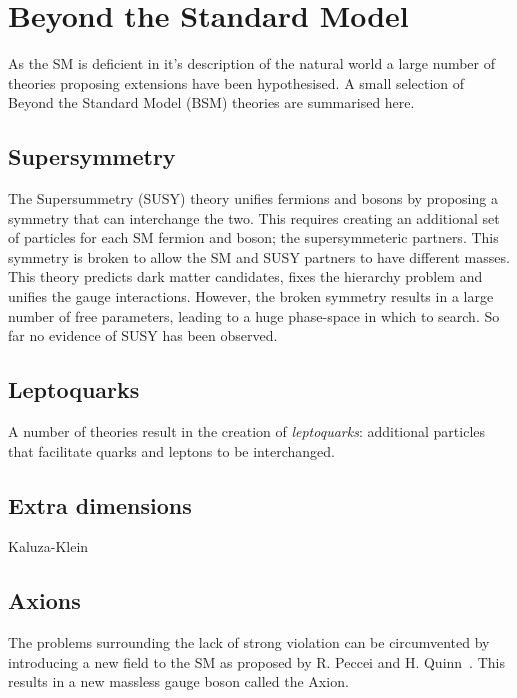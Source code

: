 \section{Beyond the Standard Model}
As the SM is deficient in it's description of the natural world a large number of theories proposing extensions have been hypothesised.
A small selection of Beyond the Standard Model (BSM) theories are summarised here. 

\subsection{Supersymmetry}

The Supersummetry (SUSY) theory unifies fermions and bosons by proposing a symmetry that can interchange the two. This requires creating an additional set of particles for each SM fermion and boson; the supersymmeteric partners. This symmetry is broken to allow the SM and SUSY partners to have different masses. This theory predicts dark matter candidates, fixes the hierarchy problem and unifies the gauge interactions. 
However, the broken symmetry results in a large number of free parameters, leading to a huge phase-space in which to search. So far no evidence of SUSY has been observed.

\subsection{Leptoquarks}

A number of theories result in the creation of \emph{leptoquarks}: additional particles that facilitate quarks and leptons to be interchanged. 

\subsection{Extra dimensions}
Kaluza-Klein


\subsection{Axions}
The problems surrounding the lack of strong \CP violation can be circumvented by introducing a new field to the SM as proposed by R. Peccei and H. Quinn~\cite{PhysRevLett.38.1440}. This results in a new massless gauge boson called the Axion.     

